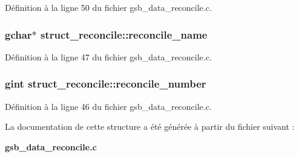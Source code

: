 Définition à la ligne 50 du fichier gsb\_\-data\_\-reconcile.c.

\subsubsection[{reconcile\_\-name}]{\setlength{\rightskip}{0pt plus 5cm}gchar$\ast$ {\bf struct\_\-reconcile::reconcile\_\-name}}\label{structstruct__reconcile_ac687c645fe52b8f865babadeccc315c3}


Définition à la ligne 47 du fichier gsb\_\-data\_\-reconcile.c.

\subsubsection[{reconcile\_\-number}]{\setlength{\rightskip}{0pt plus 5cm}gint {\bf struct\_\-reconcile::reconcile\_\-number}}\label{structstruct__reconcile_a7814616dcf1b2968afe615c979ffccb1}


Définition à la ligne 46 du fichier gsb\_\-data\_\-reconcile.c.



La documentation de cette structure a été générée à partir du fichier suivant :\begin{DoxyCompactItemize}
\item 
{\bf gsb\_\-data\_\-reconcile.c}\end{DoxyCompactItemize}
